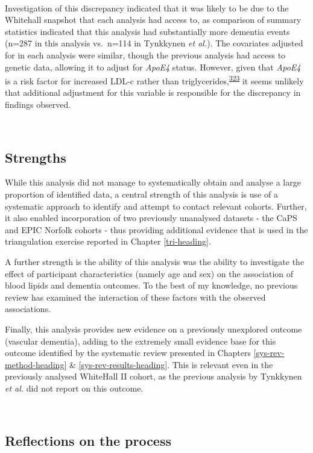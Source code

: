 \documentclass[a4paper, twoside]{templates/ociamthesis}
\begin{document}
~

Investigation of this discrepancy indicated that it was likely to be due to the Whitehall snapshot that each analysis had access to, as comparison of summary statistics indicated that this analysis had substantially more dementia events (n=287 in this analysis vs.~n=114 in Tynkkynen \emph{et al.}). The covariates adjusted for in each analysis were similar, though the previous analysis had access to genetic data, allowing it to adjust for \emph{ApoE4} status. However, given that \emph{ApoE4} is a risk factor for increased LDL-c rather than triglycerides,\textsuperscript{\protect\hyperlink{ref-bennet2007}{323}} it seems unlikely that additional adjustment for this variable is responsible for the discrepancy in findings observed.

~

\hypertarget{strengths-1}{%
\subsection{Strengths}\label{strengths-1}}

While this analysis did not manage to systematically obtain and analyse a large proportion of identified data, a central strength of this analysis is use of a systematic approach to identify and attempt to contact relevant cohorts. Further, it also enabled incorporation of two previously unanalysed datasets - the CaPS and EPIC Norfolk cohorts - thus providing additional evidence that is used in the triangulation exercise reported in Chapter \ref{tri-heading}.

A further strength is the ability of this analysis was the ability to investigate the effect of participant characteristics (namely age and sex) on the association of blood lipids and dementia outcomes. To the best of my knowledge, no previous review has examined the interaction of these factors with the observed associations.

Finally, this analysis provides new evidence on a previously unexplored outcome (vascular dementia), adding to the extremely small evidence base for this outcome identified by the systematic review presented in Chapters \ref{sys-rev-method-heading} \& \ref{sys-rev-results-heading}. This is relevant even in the previously analysed WhiteHall II cohort, as the previous analysis by Tynkkynen \emph{et al.} did not report on this outcome.

~

\hypertarget{reflections-on-the-process}{%
\subsection{Reflections on the process}\label{reflections-on-the-process}}
\end{document}
